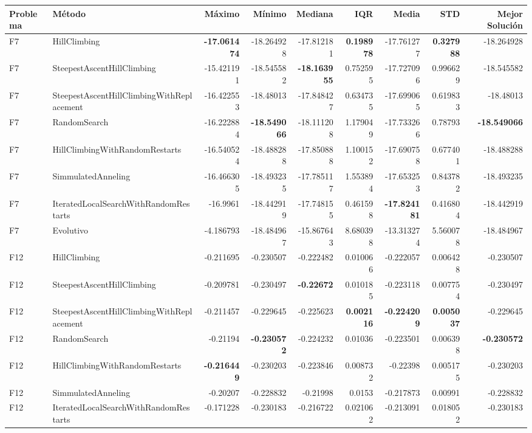 \begin{tabular}{llrrrrrrr}
\toprule
Problema & Método & Máximo & Mínimo & Mediana & IQR & Media & STD & Mejor Solución \\ 
\midrule
F7 & HillClimbing & \textbf{-17.061474} & -18.264928 & -17.812181 & \textbf{0.198978} & -17.761277 & \textbf{0.327988} & -18.264928 \\ 
F7 & SteepestAscentHillClimbing & -15.421191 & -18.545582 & \textbf{-18.163955} & 0.752595 & -17.727096 & 0.996629 & -18.545582 \\ 
F7 & SteepestAscentHillClimbingWithReplacement & -16.422553 & -18.48013 & -17.848427 & 0.634735 & -17.699065 & 0.619833 & -18.48013 \\ 
F7 & RandomSearch & -16.222884 & \textbf{-18.549066} & -18.111208 & 1.179049 & -17.733266 & 0.78793 & \textbf{-18.549066} \\ 
F7 & HillClimbingWithRandomRestarts & -16.540524 & -18.488288 & -17.850888 & 1.100152 & -17.690758 & 0.677401 & -18.488288 \\ 
F7 & SimmulatedAnneling & -16.466305 & -18.493235 & -17.785117 & 1.553894 & -17.653253 & 0.843782 & -18.493235 \\ 
F7 & IteratedLocalSearchWithRandomRestarts & -16.9961 & -18.442919 & -17.748155 & 0.461598 & \textbf{-17.824181} & 0.416804 & -18.442919 \\ 
F7 & Evolutivo & -4.186793 & -18.484967 & -15.867643 & 8.680398 & -13.313274 & 5.560078 & -18.484967 \\ 
\midrule
F12 & HillClimbing & -0.211695 & -0.230507 & -0.222482 & 0.010066 & -0.222057 & 0.006428 & -0.230507 \\ 
F12 & SteepestAscentHillClimbing & -0.209781 & -0.230497 & \textbf{-0.22672} & 0.010185 & -0.223118 & 0.007754 & -0.230497 \\ 
F12 & SteepestAscentHillClimbingWithReplacement & -0.211457 & -0.229645 & -0.225623 & \textbf{0.002116} & \textbf{-0.224209} & \textbf{0.005037} & -0.229645 \\ 
F12 & RandomSearch & -0.21194 & \textbf{-0.230572} & -0.224232 & 0.01036 & -0.223501 & 0.006398 & \textbf{-0.230572} \\ 
F12 & HillClimbingWithRandomRestarts & \textbf{-0.216449} & -0.230203 & -0.223846 & 0.008732 & -0.22398 & 0.005175 & -0.230203 \\ 
F12 & SimmulatedAnneling & -0.20207 & -0.228832 & -0.21998 & 0.0153 & -0.217873 & 0.00991 & -0.228832 \\ 
F12 & IteratedLocalSearchWithRandomRestarts & -0.171228 & -0.230183 & -0.216722 & 0.021062 & -0.213091 & 0.018052 & -0.230183 \\ 

\end{tabular}

